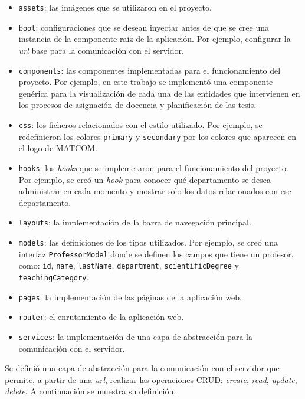 \begin{itemize}
    \item \texttt{assets}: las imágenes que se utilizaron en el proyecto.
    \item \texttt{boot}: configuraciones que se desean inyectar antes de que se cree una instancia de la componente 
    raíz de la aplicación. Por ejemplo, configurar la \textit{url} base para la comunicación con el servidor. 
    \item \texttt{components}: las componentes implementadas para el funcionamiento del proyecto. 
    Por ejemplo, en este trabajo se implementó una componente genérica para la visualización de cada una de las entidades 
    que intervienen en los procesos de asignación de docencia y planificación de las tesis.  
    \item \texttt{css}: los ficheros relacionados con el estilo utilizado. Por ejemplo, se redefinieron los colores 
    \texttt{primary} y \texttt{secondary} por los colores que aparecen en el logo de MATCOM. 
    \item \texttt{hooks}: los \textit{hooks} que se implemetaron para el funcionamiento del proyecto.
    Por ejemplo, se creó un \textit{hook} para conocer qué departamento se desea administrar en cada momento 
    y mostrar solo los datos relacionados con ese departamento.
    \item \texttt{layouts}: la implementación de la barra de navegación principal.
    \item \texttt{models}: las definiciones de los tipos utilizados. Por ejemplo, se creó una interfaz \texttt{ProfessorModel} donde se definen los 
    campos que tiene un profesor, como: \texttt{id}, \texttt{name}, \texttt{lastName}, \texttt{department}, \texttt{scientificDegree} y \texttt{teachingCategory}.  
    \item \texttt{pages}: la implementación de las páginas de la aplicación web.
    \item \texttt{router}: el enrutamiento de la aplicación web.
    \item \texttt{services}: la implementación de una capa de abstracción para la comunicación con el servidor.
\end{itemize}


Se definió una capa de abstracción para la comunicación con 
el servidor que permite, a partir de una \textit{url}, realizar las operaciones CRUD: \textit{create}, \textit{read}, \textit{update}, \textit{delete}. 
A continuación se muestra su definición.



